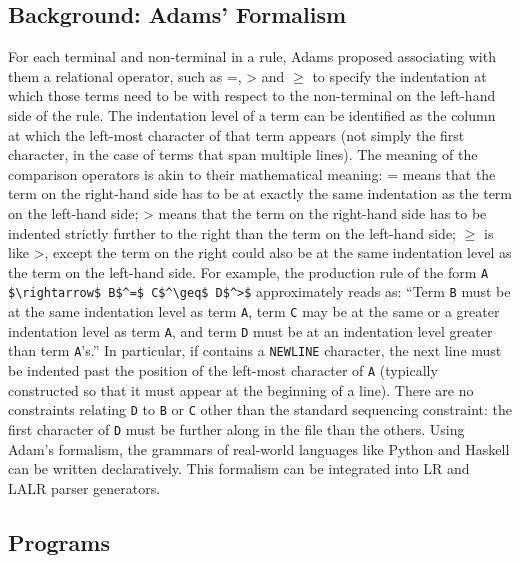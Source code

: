\subsection{Background: Adams' Formalism}
For each terminal and non-terminal in a rule, Adams proposed associating with them a relational operator, such as =, > and $\geq$ to specify the indentation at which those terms need to be with respect to the non-terminal on the left-hand side of the rule. The indentation level of a term can be identified as the column at which the left-most character of that term appears (not simply the first character, in the case of terms that span multiple lines). The meaning of the comparison operators is akin to their mathematical meaning: = means that the term on the right-hand side has to be at exactly the same indentation as the term on the left-hand side; >  means that the term on the right-hand side has to be indented strictly further to the right than the term on the left-hand side; $\geq$ is like >, except the term on the right could also be at the same indentation level as the term on the left-hand side. For example, the production rule of the form \lstinline{A $\rightarrow$ B$^=$ C$^\geq$ D$^>$} approximately reads as: ``Term \lstinline{B} must be at the same indentation level as term \lstinline{A}, term \lstinline{C} may be at the same or a greater indentation level as term \lstinline{A}, and term \lstinline{D} must be at an indentation level greater than term \lstinline{A}'s.'' In particular, if  contains a \lstinline{NEWLINE} character, the next line must be indented past the position of the left-most character of \lstinline{A} (typically constructed so that it must appear at the beginning of a line). There are no constraints relating \lstinline{D} to \lstinline{B} or \lstinline{C} other than the standard sequencing constraint: the first character of \lstinline{D} must be further along in the file than the others. Using Adam's formalism, the grammars of real-world languages like Python and Haskell can be written declaratively. This formalism can be integrated into LR and LALR parser generators.

\subsection{Programs}

